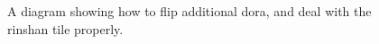 \begin{figure}[H]
\begin{center}
\begin{tikzpicture}[scale=0.25]\centering

\end{tikzpicture}
\caption{A diagram showing how to flip additional dora, and deal with the rinshan tile properly.}
\end{center}
\end{figure}

